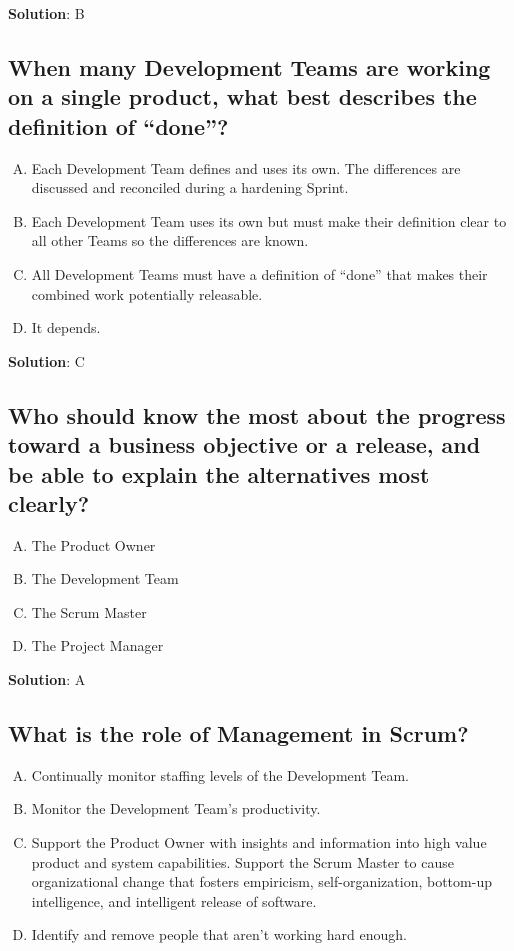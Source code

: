 \textbf{Solution}: B



\subsection{When many Development Teams are working on a single product, what best describes the definition of \enquote{done}?}
\begin{enumerate}[A)]
  \item Each Development Team defines and uses its own. The differences are discussed and reconciled during a hardening Sprint.
  \item Each Development Team uses its own but must make their definition clear to all other Teams so the differences are known.
  \item All Development Teams must have a definition of \enquote{done} that makes their combined work potentially releasable.
  \item It depends.
\end{enumerate}


\textbf{Solution}: C


\subsection{Who should know the most about the progress toward a business objective or a release, and be able to explain the alternatives most clearly?}
\begin{enumerate}[A)]
  \item The Product Owner
  \item The Development Team
  \item The Scrum Master
  \item The Project Manager
\end{enumerate}

\textbf{Solution}: A


\subsection{What is the role of Management in Scrum?}
\begin{enumerate}[A)]
  \item Continually monitor staffing levels of the Development Team.
  \item Monitor the Development Team's productivity.
  \item Support the Product Owner with insights and information into high value product and system capabilities. Support the Scrum Master to cause organizational change that fosters empiricism, self-organization, bottom-up intelligence, and intelligent release of software.
  \item Identify and remove people that aren't working hard enough.
\end{enumerate}


